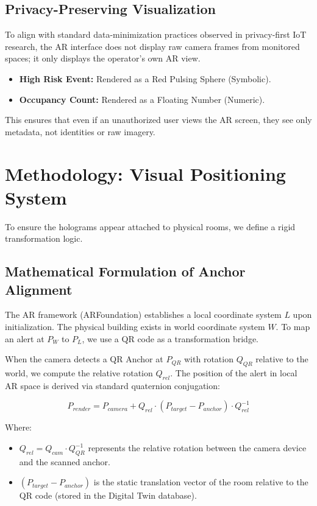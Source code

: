 \documentclass[conference]{IEEEtran}
\begin{document}
\subsection{Privacy-Preserving Visualization}
To align with standard data-minimization practices observed in privacy-first IoT research, the AR interface does not display raw camera frames from monitored spaces; it only displays the operator's own AR view.
\begin{itemize}
    \item \textbf{High Risk Event:} Rendered as a Red Pulsing Sphere (Symbolic).
    \item \textbf{Occupancy Count:} Rendered as a Floating Number (Numeric).
\end{itemize}
This ensures that even if an unauthorized user views the AR screen, they see only metadata, not identities or raw imagery.

\section{Methodology: Visual Positioning System}

To ensure the holograms appear attached to physical rooms, we define a rigid transformation logic.

\subsection{Mathematical Formulation of Anchor Alignment}
The AR framework (ARFoundation) establishes a local coordinate system $L$ upon initialization. The physical building exists in world coordinate system $W$. To map an alert at $P_W$ to $P_L$, we use a QR code as a transformation bridge.

When the camera detects a QR Anchor at $P_{QR}$ with rotation $Q_{QR}$ relative to the world, we compute the relative rotation $Q_{rel}$. The position of the alert in local AR space is derived via standard quaternion conjugation:

\begin{equation}
P_{render} = P_{camera} + Q_{rel} \cdot (P_{target} - P_{anchor}) \cdot Q_{rel}^{-1}
\end{equation}

Where:
\begin{itemize}
    \item $Q_{rel} = Q_{cam} \cdot Q_{QR}^{-1}$ represents the relative rotation between the camera device and the scanned anchor.
    \item $(P_{target} - P_{anchor})$ is the static translation vector of the room relative to the QR code (stored in the Digital Twin database).
\end{itemize}
\end{document}
